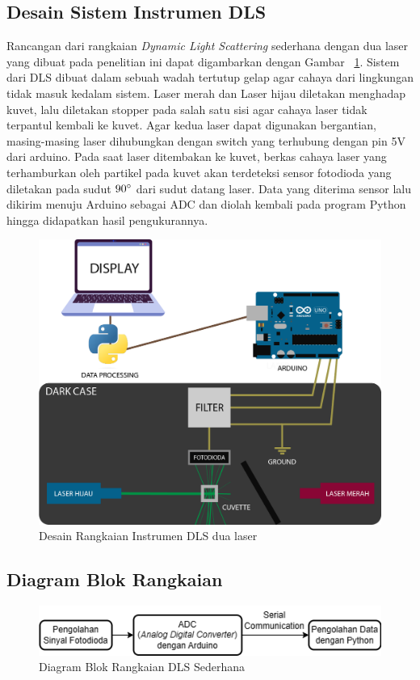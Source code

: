 \subsection{Desain Sistem Instrumen DLS}

Rancangan dari rangkaian \textit{Dynamic Light Scattering} sederhana dengan dua laser yang
dibuat pada penelitian ini dapat digambarkan dengan Gambar ~\ref{fig:schemacirc}. Sistem dari
DLS dibuat dalam sebuah wadah tertutup gelap agar cahaya dari lingkungan tidak masuk kedalam
sistem. Laser merah dan Laser hijau diletakan menghadap kuvet, lalu diletakan stopper pada
salah satu sisi agar cahaya laser tidak terpantul kembali ke kuvet. Agar kedua laser dapat
digunakan bergantian, masing-masing laser dihubungkan dengan switch yang terhubung
dengan pin 5V dari arduino. Pada saat laser ditembakan ke kuvet, berkas cahaya laser yang
terhamburkan oleh partikel pada kuvet akan terdeteksi sensor fotodioda yang diletakan pada
sudut ${90\degree}$ dari sudut datang laser. Data yang diterima sensor lalu dikirim menuju Arduino
sebagai ADC dan diolah kembali pada program Python hingga didapatkan hasil pengukurannya.
\begin{figure}[H]
    \centering
    \includegraphics[width=14cm]{Images/Schema.png}
    \caption{Desain Rangkaian Instrumen DLS dua laser}
    \label{fig:schemacirc}
\end{figure}



\subsection{Diagram Blok Rangkaian}
\begin{figure}[H]
    \centering
    \includegraphics[width=12cm]{Images/Block Diagram.png}
    \caption{Diagram Blok Rangkaian DLS Sederhana}
    \label{fig:blockdiag}
\end{figure}

